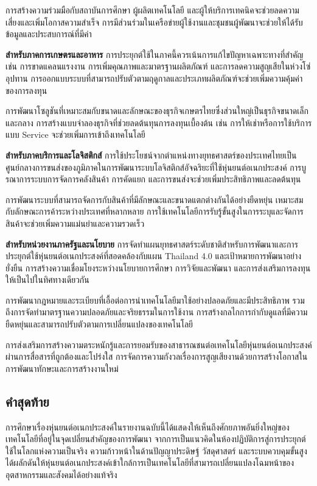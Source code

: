 \documentclass[a4paper]{article}
\begin{document}
การสร้างความร่วมมือกับสถาบันการศึกษา ผู้ผลิตเทคโนโลยี และผู้ให้บริการเทคนิคจะช่วยลดความเสี่ยงและเพิ่มโอกาสความสำเร็จ การมีส่วนร่วมในเครือข่ายผู้ใช้งานและชุมชนผู้พัฒนาจะช่วยให้ได้รับข้อมูลและประสบการณ์ที่มีค่า

\textbf{สำหรับภาคการเกษตรและอาหาร} การประยุกต์ใช้ในภาคนี้ควรเน้นการแก้ไขปัญหาเฉพาะทางที่สำคัญ เช่น การขาดแคลนแรงงาน การเพิ่มคุณภาพและมาตรฐานผลิตภัณฑ์ และการลดความสูญเสียในห่วงโซ่อุปทาน การออกแบบระบบที่สามารถปรับตัวตามฤดูกาลและประเภทผลิตภัณฑ์จะช่วยเพิ่มความคุ้มค่าของการลงทุน

การพัฒนาโซลูชันที่เหมาะสมกับขนาดและลักษณะของธุรกิจเกษตรไทยซึ่งส่วนใหญ่เป็นธุรกิจขนาดเล็กและกลาง การสร้างแบบจำลองธุรกิจที่ช่วยลดต้นทุนการลงทุนเบื้องต้น เช่น การให้เช่าหรือการใช้บริการแบบ Service จะช่วยเพิ่มการเข้าถึงเทคโนโลยี

\textbf{สำหรับภาคบริการและโลจิสติกส์} การใช้ประโยชน์จากตำแหน่งทางยุทธศาสตร์ของประเทศไทยเป็นศูนย์กลางการขนส่งของภูมิภาคในการพัฒนาระบบโลจิสติกส์อัจฉริยะที่ใช้หุ่นยนต์อเนกประสงค์ การบูรณาการระบบการจัดการคลังสินค้า การคัดแยก และการขนส่งจะช่วยเพิ่มประสิทธิภาพและลดต้นทุน

การพัฒนาระบบที่สามารถจัดการกับสินค้าที่มีลักษณะและขนาดแตกต่างกันได้อย่างยืดหยุ่น เหมาะสมกับลักษณะการค้าระหว่างประเทศที่หลากหลาย การใช้เทคโนโลยีการรับรู้ขั้นสูงในการระบุและจัดการสินค้าจะช่วยเพิ่มความแม่นยำและความรวดเร็ว

\textbf{สำหรับหน่วยงานภาครัฐและนโยบาย} การจัดทำแผนยุทธศาสตร์ระดับชาติสำหรับการพัฒนาและการประยุกต์ใช้หุ่นยนต์อเนกประสงค์ที่สอดคล้องกับแผน Thailand 4.0 และเป้าหมายการพัฒนาอย่างยั่งยืน การสร้างความเชื่อมโยงระหว่างนโยบายการศึกษา การวิจัยและพัฒนา และการส่งเสริมการลงทุนให้เป็นไปในทิศทางเดียวกัน

การพัฒนากฎหมายและระเบียบที่เอื้อต่อการนำเทคโนโลยีมาใช้อย่างปลอดภัยและมีประสิทธิภาพ รวมถึงการจัดทำมาตรฐานความปลอดภัยและจริยธรรมในการใช้งาน การสร้างกลไกการกำกับดูแลที่มีความยืดหยุ่นและสามารถปรับตัวตามการเปลี่ยนแปลงของเทคโนโลยี

การส่งเสริมการสร้างความตระหนักรู้และการยอมรับของสาธารณชนต่อเทคโนโลยีหุ่นยนต์อเนกประสงค์ผ่านการสื่อสารที่ถูกต้องและโปร่งใส การจัดการความกังวลเรื่องการสูญเสียงานด้วยการสร้างโอกาสในการพัฒนาทักษะและการสร้างงานใหม่

\subsection{คำสุดท้าย}

การศึกษาเรื่องหุ่นยนต์อเนกประสงค์ในรายงานฉบับนี้ได้แสดงให้เห็นถึงศักยภาพอันยิ่งใหญ่ของเทคโนโลยีที่อยู่ในจุดเปลี่ยนสำคัญของการพัฒนา จากการเป็นแนวคิดในห้องปฏิบัติการสู่การประยุกต์ใช้ในโลกแห่งความเป็นจริง ความก้าวหน้าในด้านปัญญาประดิษฐ์ วัสดุศาสตร์ และระบบควบคุมขั้นสูงได้ผลักดันให้หุ่นยนต์อเนกประสงค์เข้าใกล้การเป็นเทคโนโลยีที่สามารถเปลี่ยนแปลงโฉมหน้าของอุตสาหกรรมและสังคมได้อย่างแท้จริง
\end{document}

